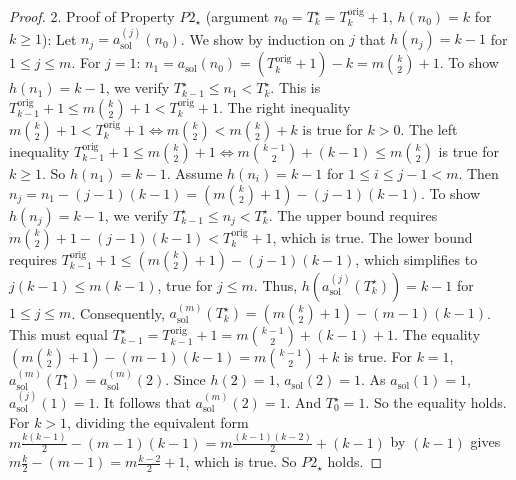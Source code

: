 \documentclass[10pt,a4paper]{amsart}
\begin{document}
\begin{proof}
2.  Proof of Property $P2_{\star}$ (argument $n_0 = T^{\star}_k = T_k^{\text{orig}}+1$, $h(n_0)=k$ for $k \ge 1$):
    Let $n_j = a_{\text{sol}}^{(j)}(n_0)$. We show by induction on $j$ that $h(n_j)=k-1$ for $1 \le j \le m$.
    For $j=1$: $n_1 = a_{\text{sol}}(n_0) = (T_k^{\text{orig}}+1)-k = m\binom{k}{2}+1$.
    To show $h(n_1)=k-1$, we verify $T^{\star}_{k-1} \le n_1 < T^{\star}_k$. This is $T_{k-1}^{\text{orig}}+1 \le m\binom{k}{2}+1 < T_k^{\text{orig}}+1$.
    The right inequality $m\binom{k}{2}+1 < T_k^{\text{orig}}+1 \iff m\binom{k}{2} < m\binom{k}{2}+k$ is true for $k>0$.
    The left inequality $T_{k-1}^{\text{orig}}+1 \le m\binom{k}{2}+1 \iff m\binom{k-1}{2}+(k-1) \le m\binom{k}{2}$ is true for $k \ge 1$. So $h(n_1)=k-1$.
    Assume $h(n_i)=k-1$ for $1 \le i \le j-1 < m$. Then $n_j = n_1-(j-1)(k-1) = (m\binom{k}{2}+1)-(j-1)(k-1)$.
    To show $h(n_j)=k-1$, we verify $T^{\star}_{k-1} \le n_j < T^{\star}_k$. The upper bound requires $m\binom{k}{2}+1-(j-1)(k-1) < T_k^{\text{orig}}+1$, which is true. The lower bound requires $T_{k-1}^{\text{orig}}+1 \le (m\binom{k}{2}+1)-(j-1)(k-1)$, which simplifies to $j(k-1) \le m(k-1)$, true for $j \le m$.
    Thus, $h(a_{\text{sol}}^{(j)}(T^{\star}_k))=k-1$ for $1 \le j \le m$.
    Consequently, $a_{\text{sol}}^{(m)}(T^{\star}_k) = (m\binom{k}{2}+1) - (m-1)(k-1)$.
    This must equal $T^{\star}_{k-1} = T_{k-1}^{\text{orig}}+1 = m\binom{k-1}{2}+(k-1)+1$.
    The equality $(m\binom{k}{2}+1) - (m-1)(k-1) = m\binom{k-1}{2}+k$ is true. For $k=1$, $a_{\text{sol}}^{(m)}(T_1^{\star})=a_{\text{sol}}^{(m)}(2)$. Since $h(2)=1$, $a_{\text{sol}}(2)=1$. As $a_{\text{sol}}(1)=1$, $a_{\text{sol}}^{(j)}(1)=1$. It follows that $a_{\text{sol}}^{(m)}(2)=1$. And $T_0^{\star}=1$. So the equality holds. For $k>1$, dividing the equivalent form $m\frac{k(k-1)}{2} - (m-1)(k-1) = m\frac{(k-1)(k-2)}{2} + (k-1)$ by $(k-1)$ gives $m\frac{k}{2} - (m-1) = m\frac{k-2}{2} + 1$, which is true. So $P2_{\star}$ holds.
\end{proof}
\end{document}
